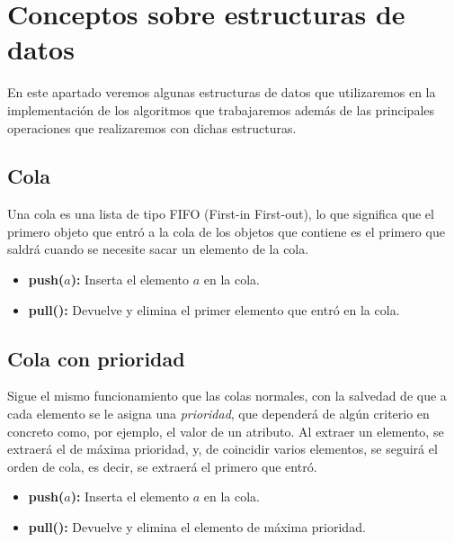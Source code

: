 \section{Conceptos sobre estructuras de datos}

En este apartado veremos algunas estructuras de datos que utilizaremos en la implementación de los algoritmos que trabajaremos además de las principales operaciones que realizaremos con dichas estructuras.

\subsection{Cola}

Una cola es una lista de tipo FIFO (First-in First-out), lo que significa que el primero objeto que entró a la cola de los objetos que contiene es el primero que saldrá cuando se necesite sacar un elemento de la cola.

\begin{itemize}
	\item \textbf{push($a$):} Inserta el elemento $a$ en la cola.
	\item \textbf{pull():} Devuelve y elimina el primer elemento que entró en la cola.
\end{itemize}

\subsection{Cola con prioridad}
	
Sigue el mismo funcionamiento que las colas normales, con la salvedad de que a cada elemento se le asigna una \textit{prioridad}, que dependerá de algún criterio en concreto como, por ejemplo, el valor de un atributo. Al extraer un elemento, se extraerá el de máxima prioridad, y, de coincidir varios elementos, se seguirá el orden de cola, es decir, se extraerá el primero que entró.

\begin{itemize}
	\item \textbf{push($a$):} Inserta el elemento $a$ en la cola.
	\item \textbf{pull():} Devuelve y elimina el elemento de máxima prioridad.
\end{itemize}

		
\endinput



